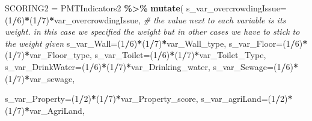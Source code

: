 \documentclass[
]{article}
\newenvironment{Shaded}{\begin{snugshade}}{\end{snugshade}}
\newcommand{\AttributeTok}[1]{\textcolor[rgb]{0.13,0.29,0.53}{#1}}
\newcommand{\CommentTok}[1]{\textcolor[rgb]{0.56,0.35,0.01}{\textit{#1}}}
\newcommand{\DecValTok}[1]{\textcolor[rgb]{0.00,0.00,0.81}{#1}}
\newcommand{\FunctionTok}[1]{\textcolor[rgb]{0.13,0.29,0.53}{\textbf{#1}}}
\newcommand{\NormalTok}[1]{#1}
\newcommand{\OtherTok}[1]{\textcolor[rgb]{0.56,0.35,0.01}{#1}}
\newcommand{\SpecialCharTok}[1]{\textcolor[rgb]{0.81,0.36,0.00}{\textbf{#1}}}
\begin{document}
\begin{Shaded}
\begin{Highlighting}[]
\NormalTok{SCORING2 }\OtherTok{=}\NormalTok{ PMTIndicators2 }\SpecialCharTok{\%\textgreater{}\%} 
  \FunctionTok{mutate}\NormalTok{(}
    \AttributeTok{s\_var\_overcrowdingIssue=}\NormalTok{(}\DecValTok{1}\SpecialCharTok{/}\DecValTok{6}\NormalTok{)}\SpecialCharTok{*}\NormalTok{(}\DecValTok{1}\SpecialCharTok{/}\DecValTok{7}\NormalTok{)}\SpecialCharTok{*}\NormalTok{var\_overcrowdingIssue, }\CommentTok{\# the value next to each variable is its weight. in this case we specified the weight but in other cases we have to stick to the weight given}
    \AttributeTok{s\_var\_Wall=}\NormalTok{(}\DecValTok{1}\SpecialCharTok{/}\DecValTok{6}\NormalTok{)}\SpecialCharTok{*}\NormalTok{(}\DecValTok{1}\SpecialCharTok{/}\DecValTok{7}\NormalTok{)}\SpecialCharTok{*}\NormalTok{var\_Wall\_type,}
    \AttributeTok{s\_var\_Floor=}\NormalTok{(}\DecValTok{1}\SpecialCharTok{/}\DecValTok{6}\NormalTok{)}\SpecialCharTok{*}\NormalTok{(}\DecValTok{1}\SpecialCharTok{/}\DecValTok{7}\NormalTok{)}\SpecialCharTok{*}\NormalTok{var\_Floor\_type,}
    \AttributeTok{s\_var\_Toilet=}\NormalTok{(}\DecValTok{1}\SpecialCharTok{/}\DecValTok{6}\NormalTok{)}\SpecialCharTok{*}\NormalTok{(}\DecValTok{1}\SpecialCharTok{/}\DecValTok{7}\NormalTok{)}\SpecialCharTok{*}\NormalTok{var\_Toilet\_Type,}
    \AttributeTok{s\_var\_DrinkWater=}\NormalTok{(}\DecValTok{1}\SpecialCharTok{/}\DecValTok{6}\NormalTok{)}\SpecialCharTok{*}\NormalTok{(}\DecValTok{1}\SpecialCharTok{/}\DecValTok{7}\NormalTok{)}\SpecialCharTok{*}\NormalTok{var\_Drinking\_water,}
    \AttributeTok{s\_var\_Sewage=}\NormalTok{(}\DecValTok{1}\SpecialCharTok{/}\DecValTok{6}\NormalTok{)}\SpecialCharTok{*}\NormalTok{(}\DecValTok{1}\SpecialCharTok{/}\DecValTok{7}\NormalTok{)}\SpecialCharTok{*}\NormalTok{var\_sewage,}
    
    \AttributeTok{s\_var\_Property=}\NormalTok{(}\DecValTok{1}\SpecialCharTok{/}\DecValTok{2}\NormalTok{)}\SpecialCharTok{*}\NormalTok{(}\DecValTok{1}\SpecialCharTok{/}\DecValTok{7}\NormalTok{)}\SpecialCharTok{*}\NormalTok{var\_Property\_score,}
    \AttributeTok{s\_var\_agriLand=}\NormalTok{(}\DecValTok{1}\SpecialCharTok{/}\DecValTok{2}\NormalTok{)}\SpecialCharTok{*}\NormalTok{(}\DecValTok{1}\SpecialCharTok{/}\DecValTok{7}\NormalTok{)}\SpecialCharTok{*}\NormalTok{var\_AgriLand,}
    

\end{Highlighting}
\end{Shaded}
\end{document}
